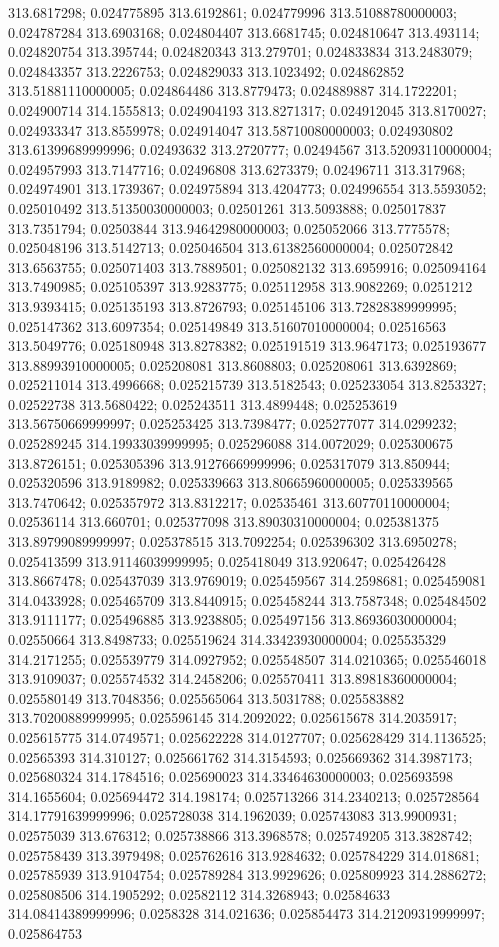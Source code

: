 313.6817298; 0.024775895 313.6192861; 0.024779996 313.51088780000003; 0.024787284 313.6903168; 0.024804407 313.6681745; 0.024810647 313.493114; 0.024820754 313.395744; 0.024820343 313.279701; 0.024833834 313.2483079; 0.024843357 313.2226753; 0.024829033 313.1023492; 0.024862852 313.51881110000005; 0.024864486 313.8779473; 0.024889887 314.1722201; 0.024900714 314.1555813; 0.024904193 313.8271317; 0.024912045 313.8170027; 0.024933347 313.8559978; 0.024914047 313.58710080000003; 0.024930802 313.61399689999996; 0.02493632 313.2720777; 0.02494567 313.52093110000004; 0.024957993 313.7147716; 0.02496808 313.6273379; 0.02496711 313.317968; 0.024974901 313.1739367; 0.024975894 313.4204773; 0.024996554 313.5593052; 0.025010492 313.51350030000003; 0.02501261 313.5093888; 0.025017837 313.7351794; 0.02503844 313.94642980000003; 0.025052066 313.7775578; 0.025048196 313.5142713; 0.025046504 313.61382560000004; 0.025072842 313.6563755; 0.025071403 313.7889501; 0.025082132 313.6959916; 0.025094164 313.7490985; 0.025105397 313.9283775; 0.025112958 313.9082269; 0.0251212 313.9393415; 0.025135193 313.8726793; 0.025145106 313.72828389999995; 0.025147362 313.6097354; 0.025149849 313.51607010000004; 0.02516563 313.5049776; 0.025180948 313.8278382; 0.025191519 313.9647173; 0.025193677 313.88993910000005; 0.025208081 313.8608803; 0.025208061 313.6392869; 0.025211014 313.4996668; 0.025215739 313.5182543; 0.025233054 313.8253327; 0.02522738 313.5680422; 0.025243511 313.4899448; 0.025253619 313.56750669999997; 0.025253425 313.7398477; 0.025277077 314.0299232; 0.025289245 314.19933039999995; 0.025296088 314.0072029; 0.025300675 313.8726151; 0.025305396 313.91276669999996; 0.025317079 313.850944; 0.025320596 313.9189982; 0.025339663 313.80665960000005; 0.025339565 313.7470642; 0.025357972 313.8312217; 0.02535461 313.60770110000004; 0.02536114 313.660701; 0.025377098 313.89030310000004; 0.025381375 313.89799089999997; 0.025378515 313.7092254; 0.025396302 313.6950278; 0.025413599 313.91146039999995; 0.025418049 313.920647; 0.025426428 313.8667478; 0.025437039 313.9769019; 0.025459567 314.2598681; 0.025459081 314.0433928; 0.025465709 313.8440915; 0.025458244 313.7587348; 0.025484502 313.9111177; 0.025496885 313.9238805; 0.025497156 313.86936030000004; 0.02550664 313.8498733; 0.025519624 314.33423930000004; 0.025535329 314.2171255; 0.025539779 314.0927952; 0.025548507 314.0210365; 0.025546018 313.9109037; 0.025574532 314.2458206; 0.025570411 313.89818360000004; 0.025580149 313.7048356; 0.025565064 313.5031788; 0.025583882 313.70200889999995; 0.025596145 314.2092022; 0.025615678 314.2035917; 0.025615775 314.0749571; 0.025622228 314.0127707; 0.025628429 314.1136525; 0.02565393 314.310127; 0.025661762 314.3154593; 0.025669362 314.3987173; 0.025680324 314.1784516; 0.025690023 314.33464630000003; 0.025693598 314.1655604; 0.025694472 314.198174; 0.025713266 314.2340213; 0.025728564 314.17791639999996; 0.025728038 314.1962039; 0.025743083 313.9900931; 0.02575039 313.676312; 0.025738866 313.3968578; 0.025749205 313.3828742; 0.025758439 313.3979498; 0.025762616 313.9284632; 0.025784229 314.018681; 0.025785939 313.9104754; 0.025789284 313.9929626; 0.025809923 314.2886272; 0.025808506 314.1905292; 0.02582112 314.3268943; 0.02584633 314.08414389999996; 0.0258328 314.021636; 0.025854473 314.21209319999997; 0.025864753 